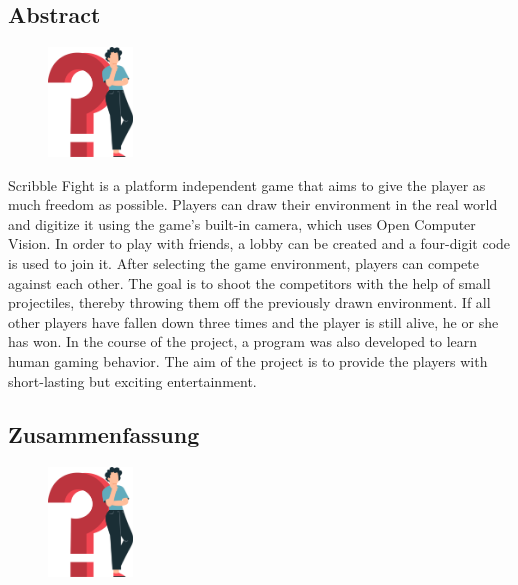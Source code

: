 \begin{spacing}{1}
  \chapter*{Abstract}
\end{spacing}
\begin{figure}
  \begin{center}
    \includegraphics[width=0.2\textwidth]{pics/question_mark.png}
  \end{center}
\end{figure}
Scribble Fight is a platform independent game that aims to give the player as much freedom as possible. 
Players can draw their environment in the real world and digitize it using the game's built-in camera, which uses Open Computer Vision.
In order to play with friends, a lobby can be created and a four-digit code is used to join it.
After selecting the game environment, players can compete against each other. 
The goal is to shoot the competitors with the help of small projectiles, thereby throwing them off the previously drawn environment. 
If all other players have fallen down three times and the player is still alive, he or she has won.
In the course of the project, a program was also developed to learn human gaming behavior.
The aim of the project is to provide the players with short-lasting but exciting entertainment.
\lipsum[6]
\newpage
\begin{spacing}{1}
  \chapter*{Zusammenfassung}
\end{spacing}
\begin{figure}
  \begin{center}
    \includegraphics[width=0.2\textwidth]{pics/question_mark.png}
  \end{center}
\end{figure}

